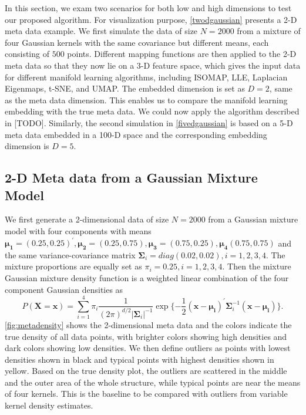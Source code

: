 \documentclass[11pt,a4paper,]{article}
\begin{document}
In this section, we exam two scenarios for both low and high dimensions to test our proposed algorithm. For visualization purpose, \autoref{twodgaussian} presents a 2-D meta data example. We first simulate the data of size \(N=2000\) from a mixture of four Gaussian kernels with the same covariance but different means, each consisting of \(500\) points. Different mapping functions are then applied to the 2-D meta data so that they now lie on a 3-D feature space, which gives the input data for different manifold learning algorithms, including ISOMAP, LLE, Laplacian Eigenmaps, t-SNE, and UMAP. The embedded dimension is set as \(D=2\), same as the meta data dimension. This enables us to compare the manifold learning embedding with the true meta data. We could now apply the algorithm described in {[}TODO{]}. Similarly, the second simulation in \autoref{fivedgaussian} is based on a 5-D meta data embedded in a 100-D space and the corresponding embedding dimension is \(D=5\).

\hypertarget{twodgaussian}{%
\subsection{2-D Meta data from a Gaussian Mixture Model}\label{twodgaussian}}

We first generate a 2-dimensional data of size \(N=2000\) from a Gaussian mixture model with four components with means \(\pmb{\mu_1}=(0.25, 0.25)^\prime, \pmb{\mu_2}=(0.25, 0.75), \pmb{\mu_3}=(0.75, 0.25), \pmb{\mu_4}(0.75, 0.75)\) and the same variance-covariance matrix \(\pmb{\Sigma}_i=diag(0.02, 0.02), i=1,2,3,4\). The mixture proportions are equally set as \(\pi_i=0.25, i=1,2,3,4\).
Then the mixture Gaussian mixture density function is a weighted linear combination of the four component Gaussian densities as
\begin{equation}
\label{eq:gmm}
P(\pmb{X}=\pmb{x}) = \sum_{i=1}^{4}\pi_i \frac{1}{(2\pi)^{d/2}|\pmb{\Sigma}_i|^{-1}} \exp{\{-\frac{1}{2} (\pmb{x}-\pmb{\mu_i})^\prime \pmb{\Sigma}_i^{-1} (\pmb{x}-\pmb{\mu_i}) \}}.
\end{equation}
\autoref{fig:metadensity} shows the 2-dimensional meta data and the colors indicate the true density of all data points, with brighter colors showing high densities and dark colors showing low densities. We then define outliers as points with lowest densities shown in black and typical points with highest densities shown in yellow. Based on the true density plot, the outliers are scattered in the middle and the outer area of the whole structure, while typical points are near the means of four kernels. This is the baseline to be compared with outliers from variable kernel density estimates.
\end{document}
